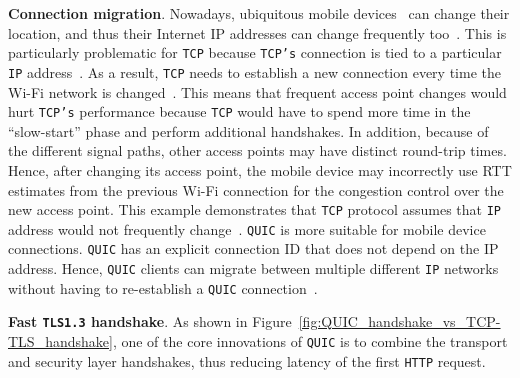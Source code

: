\documentclass[12pt,a4paper]{report}
\begin{document}
     \textbf{Connection migration}. Nowadays, ubiquitous mobile devices~\cite{bib_number_of_mobile_users} can change their location, and thus their Internet IP addresses can change frequently too~\cite{PollardBarry2019HiAP}.
    This is particularly problematic for \texttt{TCP} because \texttt{TCP's} connection is tied to a particular \texttt{IP} address~\cite{PollardBarry2019HiAP}.
    As a result, \texttt{TCP} needs to establish a new connection every time the Wi-Fi network is changed~\cite{PollardBarry2019HiAP}.
    This means that frequent access point changes would hurt \texttt{TCP's} performance because \texttt{TCP} would have to spend more time in the \enquote{slow-start} phase and perform additional handshakes.
    In addition, because of the different signal paths, other access points may have distinct round-trip times.
    Hence, after changing its access point, the mobile device may incorrectly use RTT estimates from the previous Wi-Fi connection for the congestion control over the new access point.
    This example demonstrates that \texttt{TCP} protocol assumes that \texttt{IP} address would not frequently change~\cite{PollardBarry2019HiAP}.
    \texttt{QUIC} is more suitable for mobile device connections.
    \texttt{QUIC} has an explicit connection ID that does not depend on the IP address.
    Hence, \texttt{QUIC} clients can migrate between multiple different \texttt{IP} networks without having to re-establish a \texttt{QUIC} connection~\cite{PollardBarry2019HiAP}.
    
    
    


 \textbf{Fast \texttt{TLS1.3} handshake}. As shown in Figure~\ref{fig:QUIC_handshake_vs_TCP-TLS_handshake}, one of the core innovations of \texttt{QUIC} is to combine the transport and security layer handshakes, thus reducing latency of the first \texttt{HTTP} request.
\end{document}
